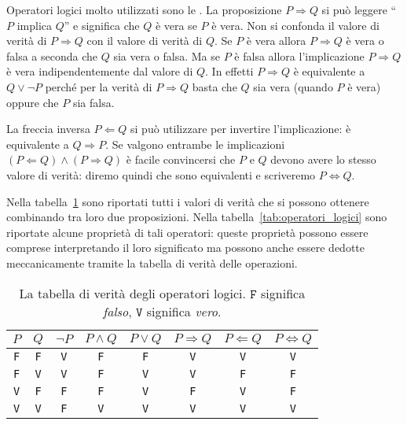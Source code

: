 Operatori logici molto utilizzati sono le .
La proposizione $P\Rightarrow Q$ si può leggere ``$P$ implica $Q$''
e significa che $Q$ è vera se $P$ è vera. Non si confonda
il valore di verità di $P\Rightarrow Q$ con il valore di verità
di $Q$. Se $P$ è vera allora $P\Rightarrow Q$ è vera o falsa
a seconda che $Q$ sia vera o falsa. Ma se $P$ è falsa allora
l'implicazione $P\Rightarrow Q$ è vera indipendentemente dal
valore di $Q$. In effetti $P\Rightarrow Q$ è equivalente a
$Q \lor \lnot P$ perché per la verità di $P\Rightarrow Q$
basta che $Q$ sia vera (quando $P$ è vera) oppure che $P$ sia falsa.

La freccia inversa $P\Leftarrow Q$ si può utilizzare per
invertire l'implicazione: è equivalente a $Q \Rightarrow P$.
Se valgono entrambe le implicazioni
$(P \Leftarrow Q) \land (P\Rightarrow Q)$
è facile convincersi che $P$ e $Q$ devono avere lo stesso
valore di verità: diremo quindi che sono equivalenti e
scriveremo $P \Leftrightarrow Q$.

Nella tabella~\ref{tab:verita_operatori_logici} sono riportati
tutti i valori di verità che si possono ottenere combinando
tra loro due proposizioni. Nella tabella~\ref{tab:operatori_logici}
sono riportate alcune proprietà di tali operatori: queste
proprietà possono essere comprese interpretando il loro significato
ma possono anche essere dedotte meccanicamente tramite la tabella
di verità delle operazioni.

\begin{table}
\begin{center}
  \begin{tabular}{cc|cccccc}
    $P$ & $Q$ & $\neg P$ & $P\land Q$ & $P\lor Q$ & $P\Rightarrow Q$ &
    $P\Leftarrow Q$ & $P\Leftrightarrow Q$ \\\hline
    \texttt{F} & \texttt{F} & \texttt{V} & \texttt{F} & \texttt{F} & \texttt{V} & \texttt{V} & \texttt{V} \\
    \texttt{F} & \texttt{V} & \texttt{V} & \texttt{F} & \texttt{V} & \texttt{V} & \texttt{F} & \texttt{F} \\
    \texttt{V} & \texttt{F} & \texttt{F} & \texttt{F} & \texttt{V} & \texttt{F} & \texttt{V} & \texttt{F} \\
    \texttt{V} & \texttt{V} & \texttt{F} & \texttt{V} & \texttt{V} & \texttt{V} & \texttt{V} & \texttt{V} \\
    \end{tabular}
\end{center}
\caption{La tabella di verità degli operatori logici. 
$\texttt{F}$ significa \emph{falso}, $\texttt{V}$ significa \emph{vero}.}
\label{tab:verita_operatori_logici}
\end{table}

